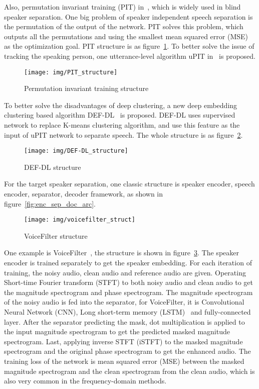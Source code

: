 Also, permutation invariant training (PIT) in~\cite{PIT}, which is widely used in blind speaker separation.
One big problem of speaker independent speech separation is the permutation of the output of the network.
PIT solves this problem, which outputs all the permutations and using the smallest mean squared error (MSE) as the optimization goal.
PIT structure is as figure~\ref{fig:PIT_structure}.
To better solve the issue of tracking the speaking person, one utterance-level algorithm uPIT in~\cite{uPIT} is proposed.
\begin{figure}[!htbp]
    \centering
    \texttt{[image: img/PIT\_structure]}
    \caption{Permutation invariant training structure~\cite{PIT}}
    \label{fig:PIT_structure}
\end{figure}

To better solve the disadvantages of deep clustering, a new deep embedding clustering based algorithm DEF-DL~\cite{DEF-DL} is proposed.
DEF-DL uses supervised network to replace K-means clustering algorithm, and use this feature as the input of uPIT network to separate speech.
The whole structure is as figure~\ref{fig:def_dl_structure}.
\begin{figure}[!htbp]
    \centering
    \texttt{[image: img/DEF-DL\_structure]}
    \caption{DEF-DL structure~\cite{DEF-DL}}
    \label{fig:def_dl_structure}
\end{figure}
For the target speaker separation, one classic structure is speaker encoder, speech encoder, separator, decoder framework, as shown in figure~\ref{fig:enc_sep_doc_arc}.

\begin{figure}[!htbp]
    \centering
    \texttt{[image: img/voicefilter\_struct]}
    \caption{VoiceFilter structure~\cite{voicefilter}}
    \label{fig:voicefilter_struct}
\end{figure}

One example is VoiceFilter~\cite{voicefilter}, the structure is shown in figure~\ref{fig:voicefilter_struct}.
The speaker encoder is trained separately to get the speaker embedding.
For each iteration of training, the noisy audio, clean audio and reference audio are given.
Operating Short-time Fourier transform (STFT) to both noisy audio and clean audio to get the magnitude spectrogram and phase spectrogram.
The magnitude spectrogram of the noisy audio is fed into the separator, for VoiceFilter, it is Convolutional Neural Network (CNN), Long short-term memory (LSTM)~\cite{LSTM} and fully-connected layer.
After the separator predicting the mask, dot multiplication is applied to the input magnitude spectrogram to get the predicted masked magnitude spectrogram.
Last, applying inverse STFT (iSTFT) to the masked magnitude spectrogram and the original phase spectrogram to get the enhanced audio.
The training loss of the network is mean squared error (MSE) between the masked magnitude spectrogram and the clean spectrogram from the clean audio, which is also very common in the frequency-domain methods.

